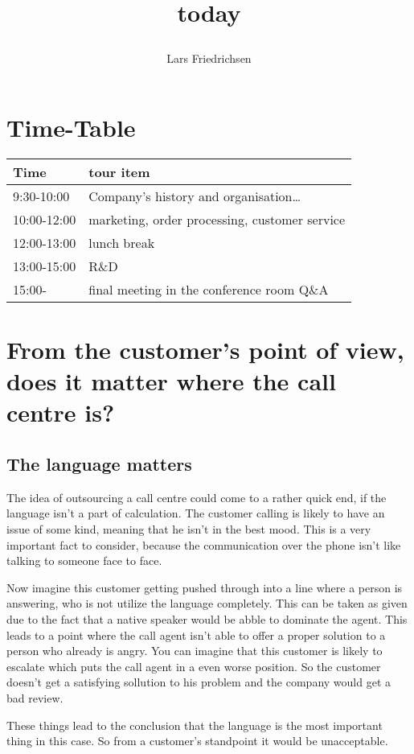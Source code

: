 \documentclass[a4paper,11pt]{scrartcl}%
\title{today\author{Lars Friedrichsen}}
\begin{document}
\section{Time-Table}

\begin{tabular}{|l|l|}
	\hline
	Time		&	tour item\\ \hline
	9:30-10:00	&	Company's history and organisation\ldots\\ \hline
	10:00-12:00	&	marketing, order processing, customer service\\ \hline
	12:00-13:00	&	lunch break\\ \hline
	13:00-15:00	&	R\&D\\ \hline
	15:00-		&	final meeting in the conference room Q\&A\\ \hline
\end{tabular}

\section{From the customer's point of view, does it matter where the call centre is?}
	
	\subsection{The language matters}
	The idea of outsourcing a call centre could come to a rather quick end, if the language isn't a part of calculation.
	The customer calling is likely to have an issue of some kind, meaning that he isn't in the best mood. This is a 
	very important fact to consider, because the communication over the phone isn't like talking to someone face to face.\par
	Now imagine this customer getting pushed through into a line where a person is answering, who is not utilize the
	language completely. This can be taken as given due to the fact that a native speaker would be abble to dominate the
	agent. This leads to a point where the call agent isn't able to offer a proper solution to a person who already is
	angry. You can imagine that this customer is likely to escalate which puts the call agent in a even worse position.
	So the customer doesn't get a satisfying sollution to his problem and the company would get a bad review.\par
	These things lead to the conclusion that the language is the most important thing in this case. So from a customer's
	standpoint it would be unacceptable.
\end{document}
